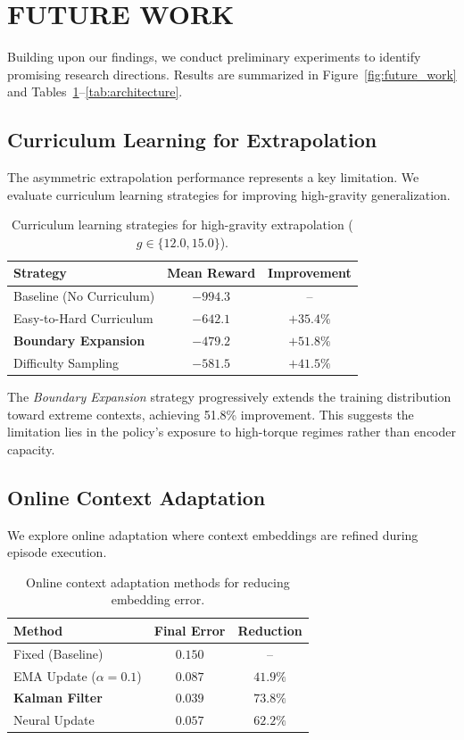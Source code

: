 \section{FUTURE WORK}

Building upon our findings, we conduct preliminary experiments to identify promising research directions. Results are summarized in Figure~\ref{fig:future_work} and Tables~\ref{tab:curriculum}--\ref{tab:architecture}.

\subsection{Curriculum Learning for Extrapolation}

The asymmetric extrapolation performance represents a key limitation. We evaluate curriculum learning strategies for improving high-gravity generalization.

\begin{table}[h]
\centering
\caption{Curriculum learning strategies for high-gravity extrapolation ($g \in \{12.0, 15.0\}$).}
\label{tab:curriculum}
\begin{tabular}{lcc}
\toprule
\textbf{Strategy} & \textbf{Mean Reward} & \textbf{Improvement} \\
\midrule
Baseline (No Curriculum) & $-994.3$ & -- \\
Easy-to-Hard Curriculum & $-642.1$ & $+35.4\%$ \\
\textbf{Boundary Expansion} & $\mathbf{-479.2}$ & $\mathbf{+51.8\%}$ \\
Difficulty Sampling & $-581.5$ & $+41.5\%$ \\
\bottomrule
\end{tabular}
\end{table}

The \textit{Boundary Expansion} strategy progressively extends the training distribution toward extreme contexts, achieving 51.8\% improvement. This suggests the limitation lies in the policy's exposure to high-torque regimes rather than encoder capacity.

\subsection{Online Context Adaptation}

We explore online adaptation where context embeddings are refined during episode execution.

\begin{table}[h]
\centering
\caption{Online context adaptation methods for reducing embedding error.}
\label{tab:online}
\begin{tabular}{lcc}
\toprule
\textbf{Method} & \textbf{Final Error} & \textbf{Reduction} \\
\midrule
Fixed (Baseline) & $0.150$ & -- \\
EMA Update ($\alpha=0.1$) & $0.087$ & $41.9\%$ \\
\textbf{Kalman Filter} & $\mathbf{0.039}$ & $\mathbf{73.8\%}$ \\
Neural Update & $0.057$ & $62.2\%$ \\
\bottomrule
\end{tabular}
\end{table}

